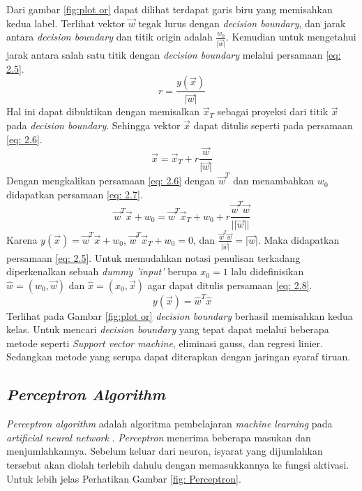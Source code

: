 Dari gambar \ref{fig:plot or} dapat dilihat terdapat garis biru yang memisahkan kedua label. Terlihat vektor $\vec{w}$ tegak lurus dengan \textit{decision boundary}, dan jarak antara \textit{decision boundary} dan titik origin adalah $\frac{w_0}{\lvert\vec{w}\rvert}$. Kemudian untuk mengetahui jarak antara salah satu titik dengan \textit{decision boundary} melalui persamaan \ref{eq: 2.5}.
\begin{equation}
    r = \frac{y(\vec{x})}{\lvert\vec{w}\rvert}
    \label{eq: 2.5}
\end{equation}
Hal ini dapat dibuktikan dengan memisalkan $\vec{x}_T$ sebagai proyeksi dari titik $\vec{x}$ pada \textit{decision boundary}. Sehingga vektor $\vec{x}$ dapat ditulis seperti pada persamaan \ref{eq: 2.6}.
\begin{equation}
    \vec{x} = \vec{x}_T + r \frac{\vec{w}}{\lvert\vec{w}\rvert}
    \label{eq: 2.6}
\end{equation}
Dengan mengkalikan persamaan \ref{eq: 2.6} dengan $\vec{w}^T$ dan menambahkan $w_0$ didapatkan persamaan \ref{eq: 2.7}.
\begin{equation}
    \vec{w}^T \vec{x} + w_0 = \vec{w}^T \vec{x}_T + w_0 + r \frac{\vec{w}^T \vec{w}}{||\vec{w}||}
    \label{eq: 2.7}
\end{equation}
Karena $y(\vec{x}) = \vec{w}^T \vec{x} + w_0$, $\vec{w}^T \vec{x}_T + w_0 = 0$, dan $\frac{\vec{w}^T \vec{w}}{\lvert\vec{w}\rvert} = \lvert\vec{w}\rvert$. Maka didapatkan persamaan \ref{eq: 2.5}. Untuk memudahkan notasi penulisan terkadang diperkenalkan sebuah \textit{dummy 'input'} berupa $x_0=1$ lalu didefinisikan $\hat{w} = (w_0, \vec{w})$ dan $\hat{x} = (x_0, \vec{x})$ agar dapat ditulis persamaan \ref{eq: 2.8}.
\begin{equation}
    y(\vec{x})=\hat{w}^T\hat{x}
    \label{eq: 2.8}
\end{equation}
Terlihat pada Gambar \ref{fig:plot or} \textit{decision boundary} berhasil memisahkan kedua kelas. Untuk mencari \textit{decision boundary} yang tepat dapat melalui beberapa metode seperti \textit{Support vector machine}, eliminasi gauss, dan regresi linier. Sedangkan metode yang serupa dapat diterapkan dengan jaringan syaraf tiruan. 

\subsection{\textit{Perceptron Algorithm}}

\textit{Perceptron algorithm} adalah algoritma pembelajaran \textit{machine learning} pada \textit{artificial neural network} \cite{Kelleher2019-cj}. \textit{Perceptron} menerima beberapa masukan dan menjumlahkannya. Sebelum keluar dari neuron, isyarat yang dijumlahkan tersebut akan diolah terlebih dahulu dengan memasukkannya ke fungsi aktivasi. Untuk lebih jelas Perhatikan Gambar \ref{fig: Perceptron}. 

